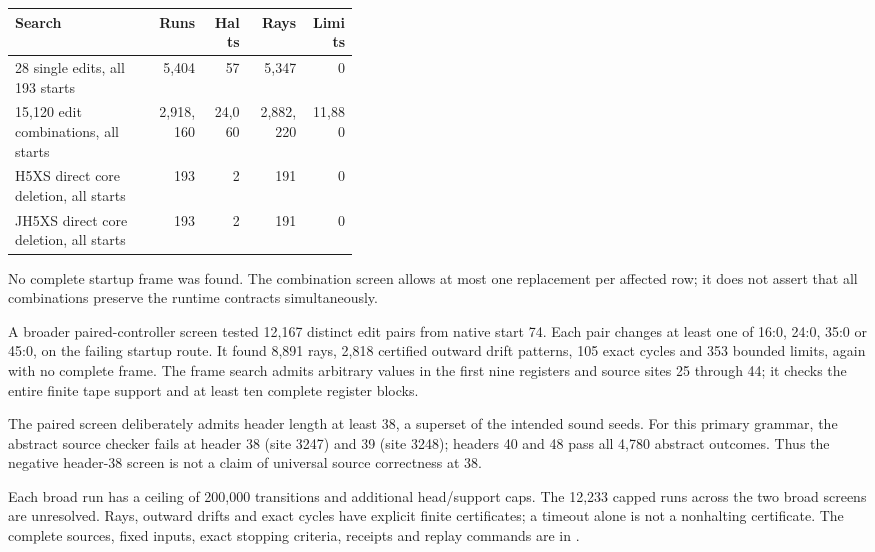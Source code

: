\begin{center}\small
\begin{tabular}{p{0.40\linewidth}rrrr}
\toprule
Search & Runs & Halts & Rays & Limits\\
\midrule
28 single edits, all 193 starts &5,404&57&5,347&0\\
15,120 edit combinations, all starts &2,918,160&24,060&2,882,220&11,880\\
H5XS direct core deletion, all starts &193&2&191&0\\
JH5XS direct core deletion, all starts &193&2&191&0\\
\bottomrule
\end{tabular}
\end{center}
No complete startup frame was found.  The combination screen allows at
most one replacement per affected row; it does not assert that all
combinations preserve the runtime contracts simultaneously.

A broader paired-controller screen tested 12,167 distinct edit pairs from
native start 74.  Each pair changes at least one of 16:0, 24:0, 35:0 or
45:0, on the failing startup route.  It found 8,891 rays, 2,818 certified
outward drift patterns, 105 exact cycles and 353 bounded limits, again
with no complete frame.  The frame search admits arbitrary values in the
first nine registers and source sites 25 through 44; it checks the entire
finite tape support and at least ten complete register blocks.

The paired screen deliberately admits header length at least 38, a
superset of the intended sound seeds.  For this primary grammar, the
abstract source checker fails at header 38 (site 3247) and 39 (site 3248);
headers 40 and 48 pass all 4,780 abstract outcomes.  Thus the negative
header-38 screen is not a claim of universal source correctness at 38.

Each broad run has a ceiling of 200,000 transitions and additional
head/support caps.  The 12,233 capped runs across the two broad screens
are unresolved.  Rays, outward drifts and exact cycles have explicit
finite certificates; a timeout alone is not a nonhalting certificate.
The complete sources, fixed inputs, exact stopping criteria, receipts and
replay commands are in .
